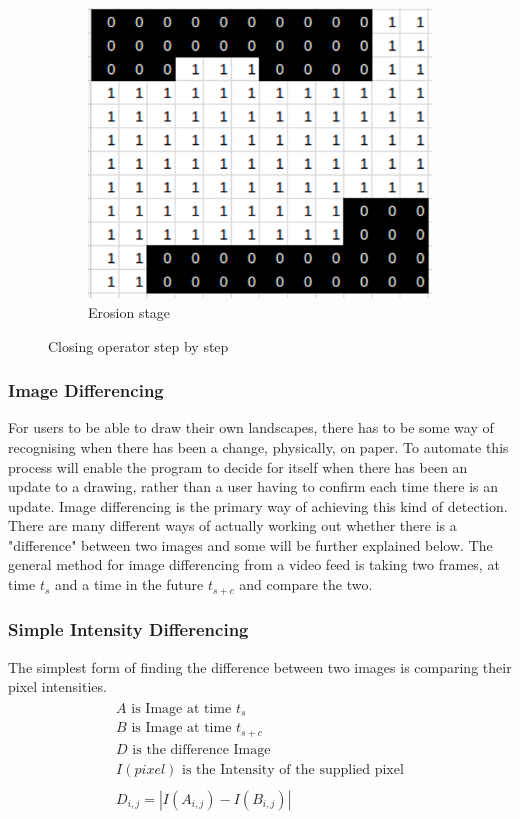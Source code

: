 \documentclass[11pt]{article}
\begin{document}
\begin{figure}
\begin{subfigure}{.32\textwidth}
		\centering
		\includegraphics[scale=0.27]{pics/closing_e}
		\caption{Erosion stage}
	\end{subfigure}
	\caption{Closing operator step by step}
	\label{fig:closing}
\end{figure}

\subsubsection{Image Differencing}
For users to be able to draw their own landscapes, there has to be some way
of recognising when there has been a change, physically, on paper. To 
automate this process will enable the program to decide for itself when
there has been an update to a drawing, rather than a user having to confirm each
time there is an update. Image differencing is the primary way of 
achieving this kind of detection. There are many different ways of actually
working out whether there is a "difference" between two images and some will
be further explained below. The general method for image differencing from
a video feed is taking two frames, at time $t_s$ and a time in the future
$t_{s+c}$ and compare the two.

\subsubsection{Simple Intensity Differencing}
The simplest form of finding the difference between two images is comparing 
their pixel intensities. 
\begin{align}
	\begin{split}
		A \text{ is Image at time } t_{s} \\
		B \text{ is Image at time } t_{s+c} \\
		D \text{ is the difference Image } \\
		I(pixel) \text{ is the Intensity of the supplied pixel} \\
		\\
		D_{i,j} = | I(A_{i,j}) - I(B_{i,j}) | 	
	\end{split}
\end{align} 
\end{document}
